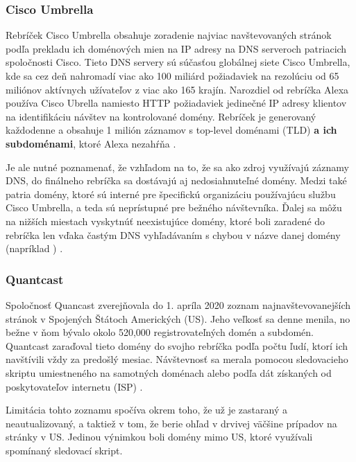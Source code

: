 \subsubsection{Cisco Umbrella}

Rebríček Cisco Umbrella obsahuje zoradenie najviac navštevovaných stránok podľa prekladu ich doménových mien na IP adresy na DNS serveroch patriacich spoločnosti Cisco.
Tieto DNS servery sú súčasťou globálnej siete Cisco Umbrella, kde sa cez deň nahromadí viac ako 100 miliárd požiadaviek na rezolúciu od 65 miliónov aktívnych užívateľov z viac ako 165 krajín.
Narozdiel od rebríčka Alexa používa Cisco Ubrella namiesto HTTP požiadaviek jedinečné IP adresy klientov na identifikáciu návštev na kontrolované domény.
Rebríček je generovaný každodenne a obsahuje 1 milión záznamov s top-level doménami (TLD) \textbf{a ich subdoménami}, ktoré Alexa nezahŕňa \cite{cisco-umbrella}.

Je ale nutné poznamenať, že vzhľadom na to, že sa ako zdroj využívajú záznamy DNS, do finálneho rebríčka sa dostávajú aj nedosiahnuteľné domény.
Medzi také patria domény, ktoré sú interné pre špecifickú organizáciu používajúcu službu Cisco Umbrella, a teda sú neprístupné pre bežného návštevníka.
Ďalej sa môžu na nižších miestach vyskytnúť neexistujúce domény, ktoré boli zaradené do rebríčka len vďaka častým DNS vyhľadávaním s chybou v názve danej domény (napríklad ) \cite{tranco-methodology}.

\pagebreak

\subsubsection{Quantcast}

Spoločnosť Quancast zverejňovala do 1. apríla 2020 zoznam najnavštevovanejších stránok v Spojených Štátoch Amerických (US). Jeho veľkosť sa denne menila, no bežne v ňom bývalo
okolo 520,000 registrovateľných domén a subdomén. Quantcast zaraďoval tieto domény do svojho rebríčka podľa počtu ľudí, ktorí ich navštívili vždy za predošlý mesiac.
Návštevnosť sa merala pomocou sledovacieho skriptu umiestneného na samotných doménach alebo podľa dát získaných od poskytovateľov internetu (ISP) \cite{tranco-methodology}.

Limitácia tohto zoznamu spočíva okrem toho, že už je zastaraný a neautualizovaný, a taktiež v tom, že berie ohľad v drvivej väčšine prípadov na stránky v US.
Jedinou výnimkou boli domény mimo US, ktoré využívali spomínaný sledovací skript. 

